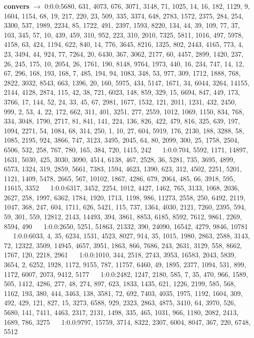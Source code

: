 \documentclass[a4paper,11pt,oneside]{book}
\begin{document}
\textbf{convers} $\rightarrow$	0:0.0:5680, 631, 4073, 676, 3071, 3148, 71, 1025, 14, 16, 182, 1129, 9, 1604, 1154, 68, 19, 217, 220, 23, 509, 335, 3374, 648, 2783, 1572, 2375, 284, 254, 3300, 537, 1989, 2234, 85, 1722, 491, 2397, 1593, 8220, 134, 44, 39, 109, 77, 37, 103, 345, 57, 10, 439, 459, 310, 952, 223, 310, 2010, 7325, 5811, 1016, 497, 5978, 4158, 63, 424, 1194, 622, 840, 14, 776, 3645, 8216, 1325, 802, 2443, 4165, 773, 4, 23, 3494, 44, 924, 77, 7264, 20, 6430, 367, 3062, 2177, 60, 4457, 2899, 1420, 237, 26, 245, 175, 10, 2054, 26, 1761, 190, 8148, 9764, 1973, 440, 16, 234, 747, 14, 12, 67, 296, 168, 193, 168, 7, 485, 194, 94, 1083, 348, 53, 977, 309, 1712, 1888, 768, 2822, 3032, 8543, 663, 1396, 20, 160, 5975, 434, 5147, 1671, 34, 6044, 3264, 14155, 2144, 4128, 2874, 115, 42, 38, 721, 6023, 148, 859, 329, 15, 6694, 847, 449, 173, 3766, 17, 144, 52, 24, 33, 45, 67, 2981, 1677, 1532, 121, 2011, 1231, 432, 2450, 999, 2, 53, 4, 22, 172, 662, 311, 401, 3251, 277, 2559, 1012, 1069, 1150, 834, 768, 334, 3048, 1790, 2717, 81, 841, 141, 224, 136, 826, 422, 479, 816, 325, 639, 197, 1094, 2271, 54, 1084, 68, 314, 250, 1, 10, 27, 604, 5919, 176, 2130, 188, 3288, 58, 1085, 2195, 924, 3866, 747, 3123, 3495, 2045, 64, 80, 2099, 300, 25, 1758, 2504, 6506, 532, 258, 767, 780, 165, 384, 720, 1415, 242	$\quad$	1:0.0:704, 5592, 1171, 14897, 1631, 5030, 425, 3030, 3090, 4514, 6138, 467, 2528, 36, 5281, 735, 3695, 4899, 6573, 1324, 319, 2859, 5661, 7383, 1594, 4623, 1390, 623, 312, 4502, 2251, 5201, 1121, 1409, 5478, 2665, 567, 10102, 1867, 4286, 679, 2064, 485, 66, 3918, 595, 11615, 3352	$\quad$	1:0.0:6317, 3452, 2254, 1012, 4427, 1462, 765, 3133, 1068, 2036, 2627, 258, 1997, 6362, 1784, 1920, 1713, 1198, 986, 11273, 2558, 250, 6492, 2119, 1047, 368, 247, 604, 1711, 626, 5421, 115, 737, 1364, 4030, 2121, 7260, 2395, 594, 59, 301, 559, 12812, 2143, 14493, 394, 3861, 8853, 6185, 8592, 7612, 9861, 2269, 8594, 490	$\quad$	1:0.0:2650, 5251, 51863, 21332, 390, 24090, 16542, 4279, 9846, 10781	$\quad$	1:0.0:6033, 4, 35, 6234, 1531, 4523, 8027, 914, 35, 1015, 1980, 2863, 2588, 3143, 72, 12322, 3509, 14945, 4657, 3951, 1863, 866, 7686, 243, 2631, 3129, 558, 8662, 1767, 120, 2218, 2961	$\quad$	1:0.0:1010, 344, 2518, 2743, 3953, 16583, 2043, 5839, 3654, 2, 6252, 1928, 1172, 9155, 787, 11757, 6460, 49, 1895, 2377, 1094, 531, 899, 1172, 6007, 2073, 9412, 5177	$\quad$	1:0.0:2482, 1247, 2180, 585, 7, 35, 470, 966, 1589, 505, 1412, 4286, 277, 48, 274, 897, 623, 1833, 1435, 621, 1226, 2199, 585, 568, 1162, 193, 380, 444, 3463, 138, 3581, 72, 692, 7403, 4035, 1975, 1192, 1604, 309, 492, 429, 121, 827, 15, 3273, 6588, 929, 2323, 2863, 4875, 3410, 64, 3970, 526, 5680, 141, 7411, 4463, 2317, 2131, 1498, 335, 465, 1031, 966, 1180, 2082, 2413, 1689, 786, 3275	$\quad$	1:0.0:9797, 15759, 3714, 8322, 2307, 6004, 8047, 367, 220, 6748, 5512
\end{document}
